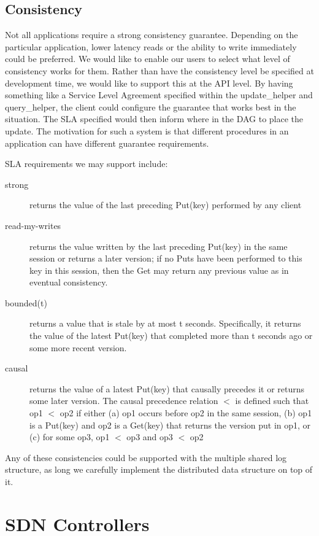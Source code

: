 \documentclass[letterpaper,twocolumn,10pt]{article}
\begin{document}
\subsection{Consistency}

Not all applications require a strong consistency guarantee. Depending on the particular application, lower latency reads or the ability to write immediately could be preferred. We would like to enable our users to select what level of consistency works for them. Rather than have the consistency level be specified at development time, we would like to support this at the API level. By having something like a Service Level Agreement specified within the update\_helper and query\_helper, the client could configure the guarantee that works best in the situation. The SLA specified would then inform where in the DAG to place the update. The motivation for such a system is that different procedures in an application can have different guarantee requirements.

SLA requirements we may support include: \cite{SLA}

\begin{description}
\item[strong] returns the value of the last preceding Put(key) performed by any client
\item[read-my-writes] returns the value written by the last preceding Put(key) in the same session or returns a later version; if no Puts have been performed to this key in this session, then the Get may return any previous value as in eventual consistency.
\item[bounded(t)] returns a value that is stale by at most t seconds. Specifically, it returns the value of the latest Put(key) that completed more than t seconds ago or some more recent version.
\item[causal] returns the value of a latest Put(key) that causally precedes it or returns some later version. The causal precedence relation $<$ is defined such that op1 $<$ op2 if either
(a) op1 occurs before op2 in the same session,
(b) op1 is a Put(key) and op2 is a Get(key) that
returns the version put in op1, or
(c) for some op3, op1 $<$ op3 and op3 $<$ op2
\end{description}

Any of these consistencies could be supported with the multiple shared log structure, as long we carefully implement the distributed data structure on top of it.

\section{SDN Controllers}
\end{document}
